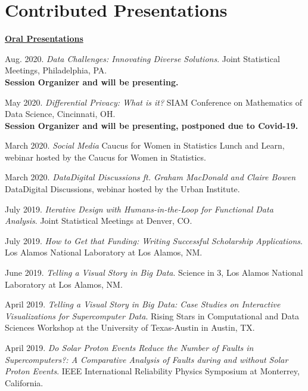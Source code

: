 \documentclass[11pt, letterpaper, roman]{moderncv} %
\begin{document}
\section{Contributed Presentations}

\underline{\textbf{\large Oral Presentations}}\normalsize
\begin{etaremune}[topsep=0pt, itemsep=5pt, partopsep=0pt, parsep=0pt]
  \item Aug. 2020. \textit{Data Challenges: Innovating Diverse Solutions}. Joint Statistical Meetings, Philadelphia, PA.\\
  \textbf{Session Organizer and will be presenting.}

  \item May 2020. \textit{Differential Privacy: What is it?} SIAM Conference on Mathematics of Data Science, Cincinnati, OH.\\
  \textbf{Session Organizer and will be presenting, postponed due to Covid-19.}
  
  \item March 2020. \textit{Social Media} Caucus for Women in Statistics Lunch and Learn, webinar hosted by the Caucus for Women in Statistics.

  \item March 2020. \textit{Data\@Urban Digital Discussions ft. Graham MacDonald and Claire Bowen} Data\@Urban Digital Discussions, webinar hosted by the Urban Institute.
  
  \item July 2019. \textit{Iterative Design with Humans-in-the-Loop for Functional Data Analysis}. Joint Statistical Meetings at Denver, CO. 

  \item July 2019. \textit{How to Get that Funding: Writing Successful Scholarship Applications}. Los Alamos National Laboratory at Los Alamos, NM.

  \item June 2019. \textit{Telling a Visual Story in Big Data}. Science in 3, Los Alamos National Laboratory at Los Alamos, NM. 
  
  \item April 2019. \textit{Telling a Visual Story in Big Data: Case Studies on Interactive Visualizations for Supercomputer Data}. Rising Stars in Computational and Data Sciences Workshop at the University of Texas-Austin in Austin, TX.

  \item April 2019. \textit{Do Solar Proton Events Reduce the Number of Faults in Supercomputers?: A Comparative Analysis of Faults during and without Solar Proton Events}. IEEE International Reliability Physics Symposium at Monterrey, California.
  

\end{etaremune}
\end{document}
